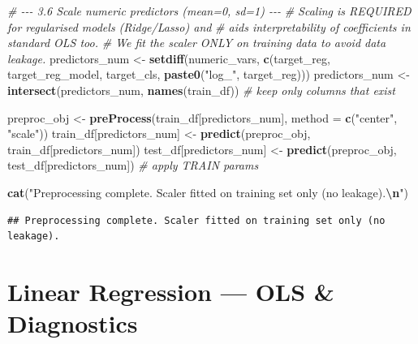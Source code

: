 \documentclass[
]{article}
\newenvironment{Shaded}{\begin{snugshade}}{\end{snugshade}}
\newcommand{\AttributeTok}[1]{\textcolor[rgb]{0.13,0.29,0.53}{#1}}
\newcommand{\CommentTok}[1]{\textcolor[rgb]{0.56,0.35,0.01}{\textit{#1}}}
\newcommand{\FunctionTok}[1]{\textcolor[rgb]{0.13,0.29,0.53}{\textbf{#1}}}
\newcommand{\NormalTok}[1]{#1}
\newcommand{\OtherTok}[1]{\textcolor[rgb]{0.56,0.35,0.01}{#1}}
\newcommand{\SpecialCharTok}[1]{\textcolor[rgb]{0.81,0.36,0.00}{\textbf{#1}}}
\newcommand{\StringTok}[1]{\textcolor[rgb]{0.31,0.60,0.02}{#1}}
\begin{document}
\begin{Shaded}
\begin{Highlighting}[]
\CommentTok{\# {-}{-}{-} 3.6  Scale numeric predictors (mean=0, sd=1) {-}{-}{-}}
\CommentTok{\# Scaling is REQUIRED for regularised models (Ridge/Lasso) and}
\CommentTok{\# aids interpretability of coefficients in standard OLS too.}
\CommentTok{\# We fit the scaler ONLY on training data to avoid data leakage.}
\NormalTok{predictors\_num }\OtherTok{\textless{}{-}} \FunctionTok{setdiff}\NormalTok{(numeric\_vars, }\FunctionTok{c}\NormalTok{(target\_reg, target\_reg\_model, target\_cls,}
                                           \FunctionTok{paste0}\NormalTok{(}\StringTok{"log\_"}\NormalTok{, target\_reg)))}
\NormalTok{predictors\_num }\OtherTok{\textless{}{-}} \FunctionTok{intersect}\NormalTok{(predictors\_num, }\FunctionTok{names}\NormalTok{(train\_df))  }\CommentTok{\# keep only columns that exist}

\NormalTok{preproc\_obj }\OtherTok{\textless{}{-}} \FunctionTok{preProcess}\NormalTok{(train\_df[predictors\_num], }\AttributeTok{method =} \FunctionTok{c}\NormalTok{(}\StringTok{"center"}\NormalTok{, }\StringTok{"scale"}\NormalTok{))}
\NormalTok{train\_df[predictors\_num] }\OtherTok{\textless{}{-}} \FunctionTok{predict}\NormalTok{(preproc\_obj, train\_df[predictors\_num])}
\NormalTok{test\_df[predictors\_num]  }\OtherTok{\textless{}{-}} \FunctionTok{predict}\NormalTok{(preproc\_obj, test\_df[predictors\_num])   }\CommentTok{\# apply TRAIN params}

\FunctionTok{cat}\NormalTok{(}\StringTok{"Preprocessing complete. Scaler fitted on training set only (no leakage).}\SpecialCharTok{\textbackslash{}n}\StringTok{"}\NormalTok{)}
\end{Highlighting}
\end{Shaded}

\begin{verbatim}
## Preprocessing complete. Scaler fitted on training set only (no leakage).
\end{verbatim}

\section{Linear Regression --- OLS \&
Diagnostics}\label{linear-regression-ols-diagnostics}
\end{document}
